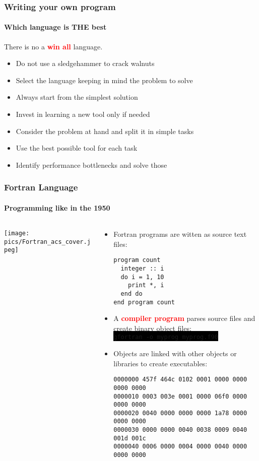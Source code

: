\documentclass[unknownkeysallowed, 10pt, a4 paper, handout]{beamer}
\newcommand{\focus}[1]{\textbf{\textcolor{red}{#1}}}
\newcommand{\code}[1]{\colorbox{black}{\color{green}\texttt{#1}}}
\begin{document}
\begin{frame}[label=whichone]
  \frametitle{Writing your own program}
  \framesubtitle{Which language is THE best}
  There is no a \focus{win all} language.
  \begin{itemize}
    \item Do not use a sledgehammer to crack walnuts
    \item Select the language keeping in mind the problem to solve
    \item Always start from the simplest solution
    \item Invest in learning a new tool only if needed
    \item Consider the problem at hand and split it in simple tasks
    \item Use the best possible tool for each task
    \item Identify performance bottlenecks and solve those
  \end{itemize}
\end{frame}


\begin{frame}[label=Fortran, fragile=singleslide]
  \frametitle{Fortran Language}
  \framesubtitle{Programming like in the 1950}
  \begin{columns}[T]
    \begin{column}{.23\textwidth}
      \vspace{30pt}
      \texttt{[image: pics/Fortran\_acs\_cover.jpeg]}
    \end{column}
    \hfill
    \begin{column}{.76\textwidth}
      \begin{itemize}
        \item Fortran programs are witten as source text files: \\
          \footnotesize{
            \begin{verbatim}
program count
  integer :: i
  do i = 1, 10
    print *, i
  end do
end program count
            \end{verbatim}
          }
        \item \normalsize{A \focus{compiler program} parses source files and
            create binary object files:} \\
          \footnotesize{
          \code{gfortran -o myprog myprog.f90}
          }
        \item \normalsize{Objects are linked with other objects or
           libraries to create executables:} \\
          \footnotesize{
            \begin{verbatim}
0000000 457f 464c 0102 0001 0000 0000 0000 0000
0000010 0003 003e 0001 0000 06f0 0000 0000 0000
0000020 0040 0000 0000 0000 1a78 0000 0000 0000
0000030 0000 0000 0040 0038 0009 0040 001d 001c
0000040 0006 0000 0004 0000 0040 0000 0000 0000
            \end{verbatim}
          }
      \end{itemize}
    \end{column}
  \end{columns}
\end{frame}
\end{document}
